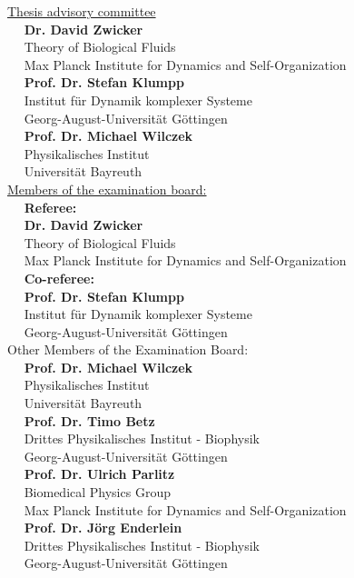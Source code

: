 \documentclass[12pt,oneside]{book}
\begin{document}
\vspace{-2cm}
\large\underline{Thesis advisory committee}\\[0.4cm]
\normalsize{
\indent $\quad$ \textbf{Dr. David Zwicker}\\[0.2cm]
\indent $\quad$ Theory of Biological Fluids
\\ 
\indent $\quad$ Max Planck Institute for Dynamics and Self-Organization\\[0.4cm]
\indent $\quad$ \textbf{Prof. Dr. Stefan Klumpp}\\[0.2cm]
\indent $\quad$ Institut f\"{u}r Dynamik komplexer Systeme \\
\indent $\quad$ Georg-August-Universität G\"{o}ttingen\\ [0.4cm]
\indent $\quad$ \textbf{Prof. Dr. Michael Wilczek}\\[0.2cm]
\indent $\quad$ Physikalisches Institut \\
\indent $\quad$ Universität Bayreuth\\ [0.4cm]
}
\large\underline{Members of the examination board:}\\[0.4cm]
\normalsize{
\indent $\quad$ \textbf{Referee:}\\
\indent $\quad$ \textbf{Dr. David Zwicker}\\[0.2cm]
\indent $\quad$ Theory of Biological Fluids\\ 
\indent $\quad$ Max Planck Institute for Dynamics and Self-Organization\\[0.4cm]
\indent $\quad$ \textbf{Co-referee:}\\
\indent $\quad$ \textbf{Prof. Dr. Stefan Klumpp}\\[0.2cm]
\indent $\quad$ Institut f\"{u}r Dynamik komplexer Systeme \\
\indent $\quad$ Georg-August-Universität G\"{o}ttingen\\ [0.4cm]
}
\large{Other Members of the Examination Board:}\\[0.5cm]
\normalsize{
\indent $\quad$ \textbf{Prof. Dr. Michael Wilczek}\\[0.2cm]
\indent $\quad$ Physikalisches Institut \\ 
\indent $\quad$ Universität Bayreuth\\ [0.4cm]
\indent $\quad$ \textbf{Prof. Dr. Timo Betz}\\[0.2cm]
\indent $\quad$ Drittes Physikalisches Institut - Biophysik \\ 
\indent $\quad$ Georg-August-Universität G\"{o}ttingen\\[0.4cm]
\indent $\quad$ \textbf{Prof. Dr. Ulrich Parlitz}\\[0.2cm]
\indent $\quad$ Biomedical Physics Group\\ 
\indent $\quad$ Max Planck Institute for Dynamics and Self-Organization\\[0.4cm]
\indent $\quad$ \textbf{Prof. Dr. J\"{o}rg Enderlein}\\[0.2cm]
\indent $\quad$ Drittes Physikalisches Institut - Biophysik\\ 
\indent $\quad$ Georg-August-Universität G\"{o}ttingen\\[0.4cm]
}
\end{document}
